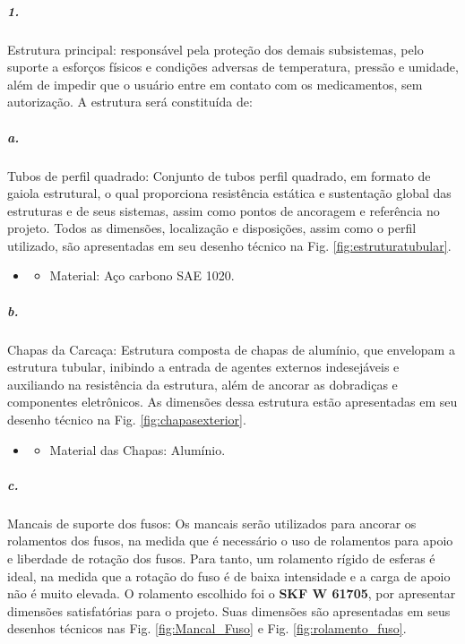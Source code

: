 \subparagraph*{1.}
Estrutura principal: responsável pela proteção dos demais subsistemas, pelo suporte a esforços físicos e condições adversas de temperatura, pressão e umidade, além de impedir que o usuário entre em contato com os medicamentos, sem autorização. A estrutura será constituída de:

    \subparagraph*{a. } \label{retorno_tubos_perfilquadrado}
    Tubos de perfil quadrado:  Conjunto de tubos perfil quadrado, em formato de gaiola estrutural, o qual proporciona resistência estática e sustentação global das estruturas e de seus sistemas, assim como pontos de ancoragem e referência no projeto. Todos as dimensões, localização e disposições, assim como o perfil utilizado, são apresentadas em seu desenho técnico na Fig. \ref{fig:estruturatubular}.
   \begin{itemize}
   \item[]
   \begin{itemize}
      \item Material: Aço carbono SAE 1020.
   \end{itemize}
   \end{itemize}
     
    \subparagraph*{b. }  \label{retorno_chapas} 
    Chapas da Carcaça: Estrutura composta de chapas de alumínio, que envelopam a estrutura tubular, inibindo a entrada de agentes externos indesejáveis e auxiliando na resistência da estrutura, além de ancorar as dobradiças e componentes eletrônicos. As dimensões dessa estrutura estão apresentadas em seu desenho técnico na Fig. \ref{fig:chapasexterior}.
   \begin{itemize}
   \item[]
   \begin{itemize}
       \item Material das Chapas: Alumínio.
   \end{itemize}
   \end{itemize}
    
     
    \subparagraph*{c.} \label{Retorno_Mancal_de_suporte} 
    Mancais de suporte dos fusos: Os mancais serão utilizados para ancorar os rolamentos dos fusos, na medida que é necessário o uso de rolamentos para apoio e liberdade de rotação dos fusos. Para tanto, um rolamento rígido de esferas é ideal, na medida que a rotação do fuso é de baixa intensidade e a carga de apoio não é muito elevada. O rolamento escolhido foi o \textbf{SKF W 61705}, por apresentar dimensões satisfatórias para o projeto.   Suas dimensões são apresentadas em seus desenhos técnicos nas Fig. \ref{fig:Mancal_Fuso} e Fig. \ref{fig:rolamento_fuso}.
    
